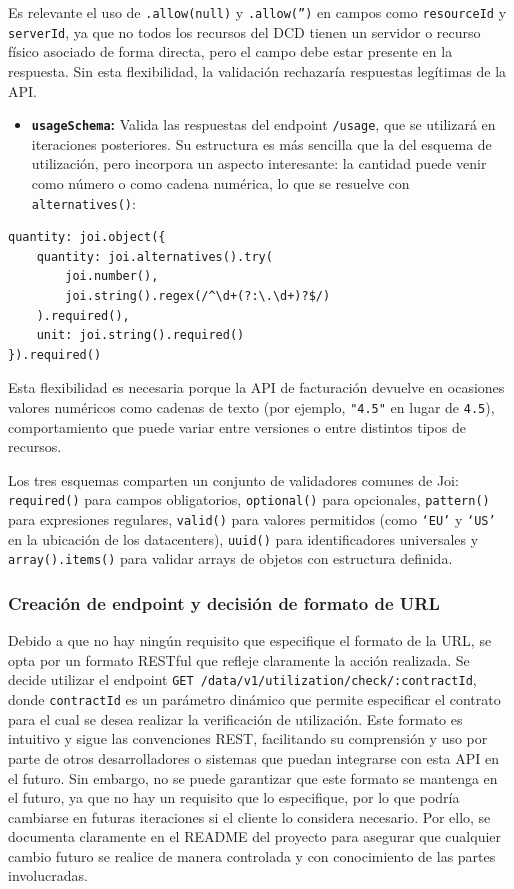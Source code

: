 Es relevante el uso de \texttt{.allow(null)} y \texttt{.allow('')} en campos como \texttt{resourceId} y \texttt{serverId}, ya que no todos los recursos del DCD tienen un servidor o recurso físico asociado de forma directa, pero el campo debe estar presente en la respuesta. Sin esta flexibilidad, la validación rechazaría respuestas legítimas de la API.

\begin{itemize}
    \item \textbf{\texttt{usageSchema}:} Valida las respuestas del endpoint \texttt{/usage}, que se utilizará en iteraciones posteriores. Su estructura es más sencilla que la del esquema de utilización, pero incorpora un aspecto interesante: la cantidad puede venir como número o como cadena numérica, lo que se resuelve con \texttt{alternatives()}:
\end{itemize}

\begin{lstlisting}[caption=Validación flexible de cantidad en usageSchema, label=lst:usage-alternatives]
quantity: joi.object({
    quantity: joi.alternatives().try(
        joi.number(),
        joi.string().regex(/^\d+(?:\.\d+)?$/)
    ).required(),
    unit: joi.string().required()
}).required()
\end{lstlisting}

Esta flexibilidad es necesaria porque la API de facturación devuelve en ocasiones valores numéricos como cadenas de texto (por ejemplo, \texttt{"4.5"} en lugar de \texttt{4.5}), comportamiento que puede variar entre versiones o entre distintos tipos de recursos.

Los tres esquemas comparten un conjunto de validadores comunes de Joi: \texttt{required()} para campos obligatorios, \texttt{optional()} para opcionales, \texttt{pattern()} para expresiones regulares, \texttt{valid()} para valores permitidos (como \texttt{`EU'} y \texttt{`US'} en la ubicación de los datacenters), \texttt{uuid()} para identificadores universales y \texttt{array().items()} para validar arrays de objetos con estructura definida.

\subsubsection{Creación de endpoint y decisión de formato de URL}
Debido a que no hay ningún requisito que especifique el formato de la URL, se opta por un formato RESTful que refleje claramente la acción realizada. Se decide utilizar el endpoint \texttt{GET /data/v1/utilization/check/:contractId}, donde \texttt{contractId} es un parámetro dinámico que permite especificar el contrato para el cual se desea realizar la verificación de utilización. Este formato es intuitivo y sigue las convenciones REST, facilitando su comprensión y uso por parte de otros desarrolladores o sistemas que puedan integrarse con esta API en el futuro.
Sin embargo, no se puede garantizar que este formato se mantenga en el futuro, ya que no hay un requisito que lo especifique, por lo que podría cambiarse en futuras iteraciones si el cliente lo considera necesario. Por ello, se documenta claramente en el README del proyecto para asegurar que cualquier cambio futuro se realice de manera controlada y con conocimiento de las partes involucradas.


